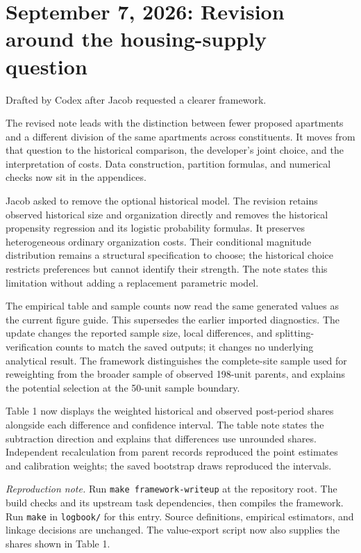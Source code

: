 \clearpage
\section*{September 7, 2026: Revision around the housing-supply question}
{\small Drafted by Codex after Jacob requested a clearer framework.}

The revised note leads with the distinction between fewer proposed apartments
and a different division of the same apartments across constituents. It moves
from that question to the historical comparison, the developer's joint choice,
and the interpretation of costs. Data construction, partition formulas, and
numerical checks now sit in the appendices.

Jacob asked to remove the optional historical model. The revision retains
observed historical size and organization directly and removes the historical
propensity regression and its logistic probability formulas. It preserves
heterogeneous ordinary organization costs. Their conditional magnitude
distribution remains a structural specification to choose; the historical
choice restricts preferences but cannot identify their strength. The note
states this limitation without adding a replacement parametric model.

The empirical table and sample counts now read the same generated values as
the current figure guide. This supersedes the earlier imported diagnostics.
The update changes the reported sample size, local differences, and
splitting-verification counts to match the saved outputs; it changes no
underlying analytical result. The framework distinguishes the complete-site
sample used for reweighting from the broader sample of observed 198-unit
parents, and explains the potential selection at the 50-unit sample boundary.

Table 1 now displays the weighted historical and observed post-period shares
alongside each difference and confidence interval. The table note states the
subtraction direction and explains that differences use unrounded shares.
Independent recalculation from parent records reproduced the point estimates
and calibration weights; the saved bootstrap draws reproduced the intervals.

{\small\textit{Reproduction note.}
Run \texttt{make framework-writeup} at the repository root. The build checks
 and its upstream task dependencies,
then compiles the framework. Run \texttt{make} in \texttt{logbook/} for this
entry. Source definitions, empirical estimators, and linkage decisions are unchanged.
The value-export script now also supplies the shares shown in Table 1.}
